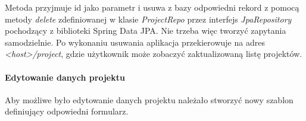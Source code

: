\documentclass[]{article}
\let\oldparagraph\paragraph
\renewcommand{\paragraph}[1]{\oldparagraph{#1}\mbox{}}
\begin{document}
Metoda przyjmuje id jako parametr i usuwa z bazy odpowiedni rekord z
pomocą metody \emph{delete} zdefiniowanej w klasie \emph{ProjectRepo}
przez interfejs \emph{JpaRepository} pochodzący z biblioteki Spring Data
JPA. Nie trzeba więc tworzyć zapytania samodzielnie. Po wykonaniu
usuwania aplikacja przekierowuje na adres
\emph{\textless{}host\textgreater{}/project}, gdzie użytkownik może
zobaczyć zaktualizowaną listę projektów.

\hypertarget{header-n141}{%
\paragraph{Edytowanie danych projektu}\label{header-n141}}

Aby możliwe było edytowanie danych projektu należało stworzyć nowy
szablon definiujący odpowiedni formularz.
\end{document}
